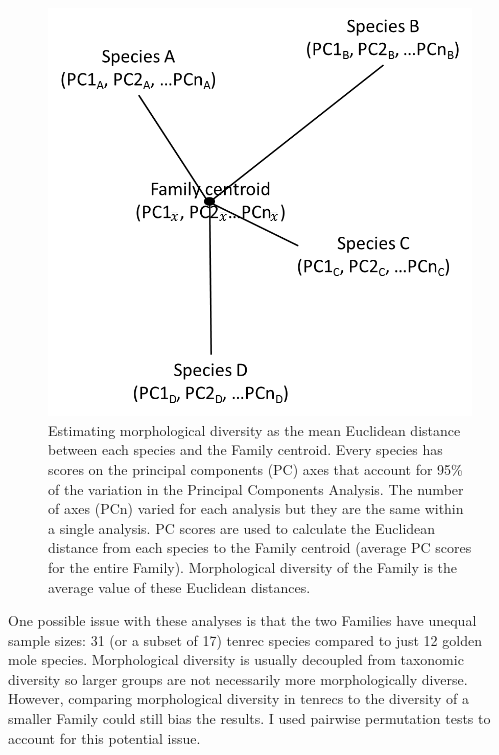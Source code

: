 	\begin{figure}[!htbp]
	\centering
	\includegraphics [width=0.7\linewidth, height=0.7\textheight, keepaspectratio]{Disparity/writing/figures/Centroids.png}
	\caption[Calculating diversity as mean Euclidean distance to Family centroid.]
		{Estimating morphological diversity as the mean Euclidean distance between each species and the Family centroid. Every species has scores on the principal components (PC) axes that account for 95\% of the variation in the Principal Components Analysis. The number of axes (PCn) varied for each analysis but they are the same within a single analysis. PC scores are used to calculate the Euclidean distance from each species to the Family centroid (average PC scores for the entire Family). Morphological diversity of the Family is the average value of these Euclidean distances.}
	\label{fig:centroids}
	\end{figure}
	

	
	One possible issue with these analyses is that the two Families have unequal sample sizes: 31 (or a subset of 17) tenrec species compared to just 12 golden mole species. Morphological diversity is usually decoupled from taxonomic diversity \citep[e.g.][]{Ruta2013, Hopkins2013} so larger groups are not necessarily more morphologically diverse. However, comparing morphological diversity in tenrecs to the diversity of a smaller Family could still bias the results. I used pairwise permutation tests to account for this potential issue. 

